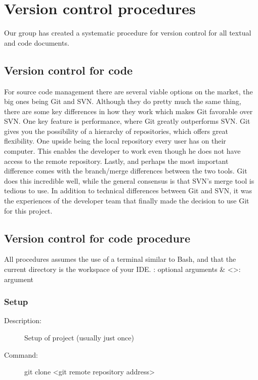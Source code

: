 

\section{Version control procedures}
Our group has created a systematic procedure for version control for all textual  and code documents. 

\subsection{Version control for code}
For source code management there are several viable options on the market, the big ones being Git and SVN. Although they do pretty much the same thing, there are some key differences in how they work which makes Git favorable over SVN. One key feature is performance, where Git greatly outperforms SVN. Git gives you the possibility of a hierarchy of repositories, which offers great flexibility. One upside being the local repository every user has on their computer. This enables the developer to work even though he does not have access to the remote repository. Lastly, and perhaps the most important difference comes with the branch/merge differences between the two tools. Git does this incredible well, while the general consensus is that SVN’s merge tool is tedious to use.  
\newline
\newline
In addition to technical differences between Git and SVN, it was the experiences of the developer team that finally made the decision to use Git for this project.

\subsection{Version control for code procedure}
All procedures assumes the use of a terminal similar to Bash, and that the current directory is the workspace of your IDE.
\newline
\newline
[]: optional arguments \& <>: argument

\subsubsection{Setup}
\begin{description}
\item[Description:] Setup of project (usually just once)
\item[Command:] git clone <git remote repository address>
\end{description}

